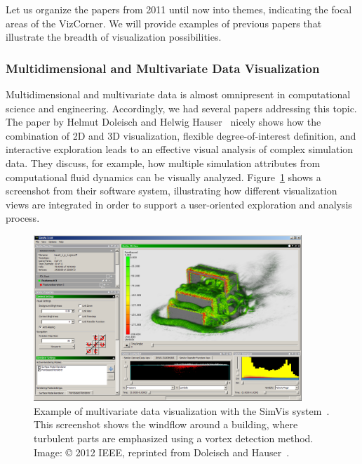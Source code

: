 \documentclass[10pt,journal,compsoc]{IEEEtran}
\begin{document}
{Let us organize the papers from 2011 until now into themes, indicating the focal areas of the VizCorner. 
We will provide examples of previous papers that illustrate the breadth of visualization possibilities.


\subsubsection{Multidimensional and Multivariate Data Visualization}

Multidimensional and multivariate data is almost omnipresent in computational science and engineering. Accordingly, we had several papers addressing this topic.
The paper by Helmut Doleisch and Helwig Hauser~\cite{Doleisch2012} nicely shows how the combination of 2D and 3D visualization, flexible degree-of-interest definition, and interactive exploration leads to an effective visual analysis of complex simulation data. They discuss, for example, how multiple simulation attributes from computational fluid dynamics can be visually analyzed. Figure~\ref{fig:simvis} shows a screenshot from their software system, illustrating how different visualization views are integrated in order to support a user-oriented exploration and analysis process.

\begin{figure}[H]
    \begin{center}    
        \includegraphics[width=0.9\textwidth]{simvis.png}
        \caption{Example of multivariate data visualization with the SimVis system~\cite{Doleisch2012}. This screenshot shows the windflow around a building, where turbulent parts are emphasized using a vortex detection method. Image: \copyright{} 2012 IEEE, reprinted from Doleisch and Hauser~\cite{Doleisch2012}.
  \label{fig:simvis}}        
    \end{center}
\end{figure}

}
\end{document}
